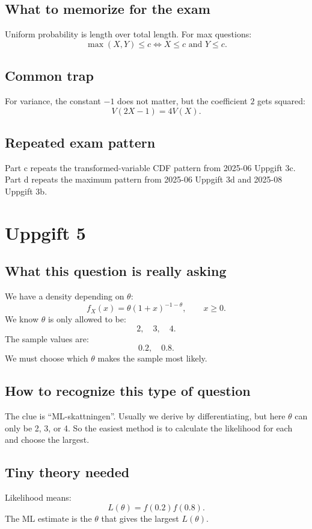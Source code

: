 \documentclass[11pt,a4paper]{article}
\begin{document}
\subsection*{What to memorize for the exam}
Uniform probability is length over total length. For max questions:
\[
\max(X,Y)\le c \iff X\le c \text{ and } Y\le c.
\]

\subsection*{Common trap}
For variance, the constant \(-1\) does not matter, but the coefficient \(2\) gets squared:
\[
V(2X-1)=4V(X).
\]

\subsection*{Repeated exam pattern}
Part c repeats the transformed-variable CDF pattern from 2025-06 Uppgift 3c. Part d repeats the maximum pattern from 2025-06 Uppgift 3d and 2025-08 Uppgift 3b.

\section*{Uppgift 5}

\subsection*{What this question is really asking}
We have a density depending on \(\theta\):
\[
f_X(x)=\theta(1+x)^{-1-\theta},\qquad x\ge 0.
\]
We know \(\theta\) is only allowed to be:
\[
2,\quad 3,\quad 4.
\]
The sample values are:
\[
0.2,\quad 0.8.
\]
We must choose which \(\theta\) makes the sample most likely.

\subsection*{How to recognize this type of question}
The clue is ``ML-skattningen''. Usually we derive by differentiating, but here \(\theta\) can only be 2, 3, or 4. So the easiest method is to calculate the likelihood for each and choose the largest.

\subsection*{Tiny theory needed}
Likelihood means:
\[
L(\theta)=f(0.2)f(0.8).
\]
The ML estimate is the \(\theta\) that gives the largest \(L(\theta)\).
\end{document}
